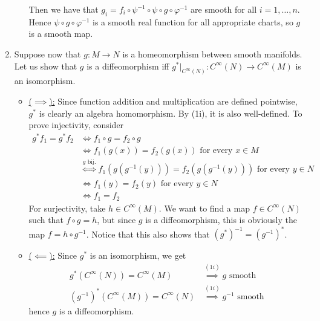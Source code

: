 \documentclass[a4paper, 12pt]{article}
\begin{document}
\begin{Exercise}
\begin{enumerate}[label=(\roman*)]
\begin{itemize}
                    Then we have that $g_i = f_i \circ \psi^{-1} \circ \psi \circ g \circ \varphi^{-1}$ are smooth for all $i = 1, \dots, n$.
                    Hence $\psi \circ g \circ \varphi^{-1}$ is a smooth real function for all appropriate charts, so $g$ is a smooth map.
            \end{itemize}
        \item
            Suppose now that $g \colon M \to N$ is a homeomorphism between smooth manifolds.
            Let us show that $g$ is a diffeomorphism iff $g^*|_{C^\infty(N)} \colon C^\infty(N) \to C^\infty(M)$ is an isomorphism.

            \begin{itemize}
                \item \underline{($\implies$):}
                    Since function addition and multiplication are defined pointwise, $g^*$ is clearly an algebra homomorphism.
                    By (1i), it is also well-defined.
                    To prove injectivity, consider
                    \begin{align*}
                        g^*f_1 = g^*f_2 &\iff f_1 \circ g = f_2 \circ g \\
                        &\iff f_1(g(x)) = f_2(g(x)) \text{ for every $x \in M$} \\
                        &\overset{g \text{ bij.}}{\iff} f_1(g(g^{-1}(y))) = f_2(g(g^{-1}(y))) \text{ for every $y \in N$} \\
                        &\iff f_1(y) = f_2(y) \text{ for every $y \in N$} \\
                        &\iff f_1 = f_2
                    \end{align*}
                    For surjectivity, take $h \in C^\infty(M)$.
                    We want to find a map $f \in C^\infty(N)$ such that $f \circ g = h$,
                    but since $g$ is a diffeomorphism, this is obviously the map $f = h \circ g^{-1}$.
                    Notice that this also shows that $(g^*)^{-1} = (g^{-1})^*$.
                \item \underline{($\impliedby$):}
                    Since $g^*$ is an isomorphism, we get
                    \begin{align*}
                        g^*(C^\infty(N)) = C^\infty(M) &\overset{(1i)}{\implies} g \text{ smooth} \\
                        (g^{-1})^*(C^\infty(M)) = C^\infty(N) &\overset{(1i)}{\implies} g^{-1} \text{ smooth}
                    \end{align*}
                    hence $g$ is a diffeomorphism.
            \end{itemize}
    \end{enumerate}
\end{Exercise}
\end{document}
